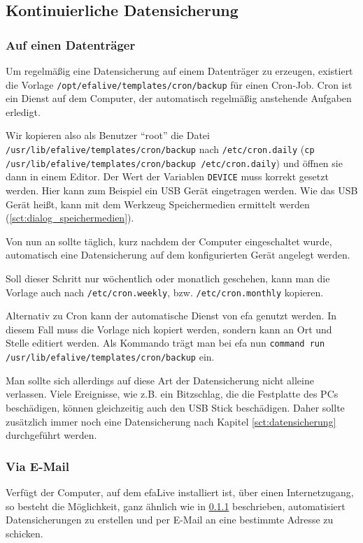 \documentclass[a4paper,12pt,twoside]{article}
\begin{document}
\subsection{Kontinuierliche Datensicherung}
\label{sct:kont_backup}
\subsubsection{Auf einen Datenträger}
\label{sct:cont_device}
Um regelmäßig eine Datensicherung auf
einem Datenträger zu erzeugen, existiert die Vorlage
\texttt{/opt/efalive/templates/cron/backup} für einen Cron-Job. Cron ist ein
Dienst auf dem Computer, der automatisch regelmäßig anstehende Aufgaben
erledigt.

Wir kopieren also als Benutzer "`root"' die
Datei \linebreak[4]\texttt{/usr/lib/efalive/templates/cron/backup} nach 
\texttt{/etc/cron.daily} \linebreak[4](\texttt{cp
/usr/lib/efalive/templates/cron/backup /etc/cron.daily}) und öffnen \linebreak[4]sie
dann in einem Editor. Der Wert der Variablen \texttt{DEVICE} muss korrekt
gesetzt werden. Hier kann zum Beispiel ein USB Gerät eingetragen
werden. Wie das USB Gerät heißt, kann mit dem Werkzeug Speichermedien
ermittelt werden (\ref{sct:dialog_speichermedien}).

Von nun an sollte täglich, kurz nachdem der Computer eingeschaltet
wurde, automatisch eine Datensicherung auf dem konfigurierten Gerät
angelegt werden.

Soll dieser Schritt nur wöchentlich oder monatlich geschehen, kann man
die Vorlage auch nach \texttt{/etc/cron.weekly}, bzw. \texttt{/etc/cron.monthly}
kopieren.

Alternativ zu Cron kann der automatische Dienst von efa genutzt werden.
In diesem Fall muss die Vorlage nich kopiert werden, sondern kann an
Ort und Stelle editiert werden. Als Kommando trägt man bei efa nun
\linebreak[4]\texttt{command run /usr/lib/efalive/templates/cron/backup} ein.

Man sollte sich allerdings auf diese Art der Datensicherung nicht
alleine verlassen. Viele Ereignisse, wie z.B. ein Bitzschlag, die die
Festplatte des PCs beschädigen, können gleichzeitig auch den USB Stick
beschädigen. Daher sollte zusätzlich immer noch eine Datensicherung
nach Kapitel \ref{sct:datensicherung} durchgeführt werden.


\subsubsection{Via E-Mail}
\label{cont_mail}
Verfügt der Computer, auf dem efaLive installiert ist, über einen
Internetzugang, so besteht die Möglichkeit, ganz ähnlich wie in \ref{sct:cont_device}
beschrieben, automatisiert Datensicherungen zu erstellen und per E-Mail
an eine bestimmte Adresse zu schicken. 
\end{document}
